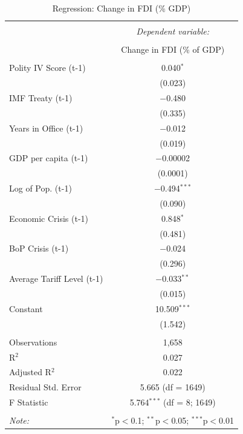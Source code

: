 \documentclass[12pt]{article}\usepackage[]{graphicx}\usepackage[]{color}
\begin{document}
\begin{table}[!htbp] \centering 
  \caption{Regression: Change in FDI (\% GDP)} 
  \label{} 
\begin{tabular}{@{\extracolsep{5pt}}lc} 
\\[-1.8ex]\hline 
\hline \\[-1.8ex] 
 & \multicolumn{1}{c}{\textit{Dependent variable:}} \\ 
\cline{2-2} 
\\[-1.8ex] & Change in FDI (\% of GDP) \\ 
\hline \\[-1.8ex] 
 Polity IV Score (t-1) & 0.040$^{*}$ \\ 
  & (0.023) \\ 
  IMF Treaty (t-1) & $-$0.480 \\ 
  & (0.335) \\ 
  Years in Office (t-1) & $-$0.012 \\ 
  & (0.019) \\ 
  GDP per capita (t-1) & $-$0.00002 \\ 
  & (0.0001) \\ 
  Log of Pop. (t-1) & $-$0.494$^{***}$ \\ 
  & (0.090) \\ 
  Economic Crisis (t-1) & 0.848$^{*}$ \\ 
  & (0.481) \\ 
  BoP Crisis (t-1) & $-$0.024 \\ 
  & (0.296) \\ 
  Average Tariff Level (t-1) & $-$0.033$^{**}$ \\ 
  & (0.015) \\ 
  Constant & 10.509$^{***}$ \\ 
  & (1.542) \\ 
 \hline \\[-1.8ex] 
Observations & 1,658 \\ 
R$^{2}$ & 0.027 \\ 
Adjusted R$^{2}$ & 0.022 \\ 
Residual Std. Error & 5.665 (df = 1649) \\ 
F Statistic & 5.764$^{***}$ (df = 8; 1649) \\ 
\hline 
\hline \\[-1.8ex] 
\textit{Note:}  & \multicolumn{1}{r}{$^{*}$p$<$0.1; $^{**}$p$<$0.05; $^{***}$p$<$0.01} \\ 
\end{tabular} 
\end{table} 
\end{document}
